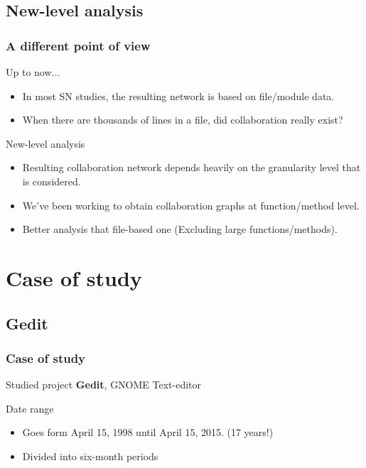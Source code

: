 \documentclass{beamer}
\begin{document}
\subsection{New-level analysis} %
\begin{frame}
\frametitle{A different point of view}
\begin{block}{Up to now...}
\begin{itemize}
\item In most SN studies, the resulting network is based on file/module data.
\item When there are thousands of lines in a file, did collaboration really exist?
\end{itemize}
\end{block}
\begin{block}{New-level analysis}
\begin{itemize}
\item Resulting collaboration network depends heavily on the granularity level that is considered.
\item We've been working to obtain collaboration graphs at function/method level.
\item Better analysis that file-based one (Excluding large functions/methods).
\end{itemize}
\end{block}
\end{frame}

\section{Case of study}
\subsection{Gedit}
\begin{frame}
\frametitle{Case of study}
\begin{block}{Studied project}
\textbf{Gedit}, GNOME Text-editor
\end{block}
\begin{block}{Date range}
\begin{itemize}
\item Goes form April 15, 1998 until April 15, 2015. (17 years!)
\item Divided into six-month periods
\end{itemize}
\end{block}
\end{frame}
\end{document}
